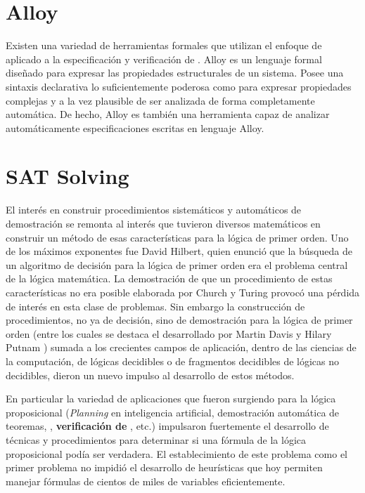 \section{Alloy}

Existen una variedad de herramientas formales que utilizan el enfoque de \bmc
aplicado a la especificación y verificación de \soft. Alloy \cite{jackson
:acmtosem-11_2} es un lenguaje formal diseñado para expresar las propiedades
estructurales de un sistema. Posee una sintaxis declarativa lo suficientemente
poderosa como para expresar propiedades complejas y a la vez plausible de ser
analizada de forma completamente automática. De hecho, Alloy es también una
herramienta capaz de analizar automáticamente especificaciones escritas en
lenguaje Alloy.



\section{SAT Solving}

El interés en construir procedimientos sistemáticos y automáticos de
demostración se remonta al interés que tuvieron diversos matemáticos en
construir un método de esas características para la lógica de primer orden.
Uno de los máximos exponentes fue David Hilbert, quien enunció que la búsqueda
de un algoritmo de decisión para la lógica de primer orden era el problema
central de la lógica matemática. La demostración de que un procedimiento de
estas características no era posible elaborada por Church y Turing provocó una
pérdida de interés en esta clase de problemas. Sin embargo la construcción de
procedimientos, no ya de decisión, sino de demostración para la lógica de
primer orden (entre los cuales se destaca el desarrollado por Martin Davis y
Hilary Putnam \cite{Davis:1960:CPQ:321033.321034}) sumada a los crecientes
campos de aplicación, dentro de las ciencias de la computación, de lógicas
decidibles o de fragmentos decidibles de lógicas no decidibles, dieron un
nuevo impulso al desarrollo de estos métodos.

En particular la variedad de aplicaciones que fueron surgiendo para la lógica
proposicional (\emph{Planning} en inteligencia artificial, demostración
automática de teoremas, \textbf{\mc}, \textbf{verificación de \soft}, etc.)
impulsaron fuertemente el desarrollo de técnicas y procedimientos para
determinar si una fórmula de la lógica proposicional podía ser verdadera. El
establecimiento de este problema como el primer problema \npc
\cite{Cook:1971:CTP:800157.805047} no impidió el desarrollo de heurísticas que
hoy permiten manejar fórmulas de cientos de miles de variables eficientemente.

